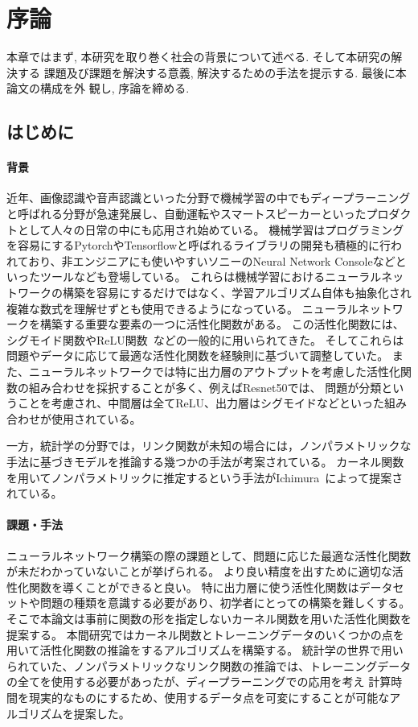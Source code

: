\chapter{序論}
\label{introduction}

本章ではまず, 本研究を取り巻く社会の背景について述べる. そして本研究の解決する
課題及び課題を解決する意義, 解決するための手法を提示する. 最後に本論文の構成を外
観し, 序論を締める.

\section{はじめに}
\label{introduction:background}

\subsubsection{背景}


近年、画像認識や音声認識といった分野で機械学習の中でもディープラーニングと呼ばれる分野が急速発展し、自動運転やスマートスピーカーといったプロダクトとして人々の日常の中にも応用され始めている。
機械学習はプログラミングを容易にするPytorchやTensorflowと呼ばれるライブラリの開発も積極的に行われており、非エンジニアにも使いやすいソニーのNeural Network Consoleなどといったツールなども登場している。
これらは機械学習におけるニューラルネットワークの構築を容易にするだけではなく、学習アルゴリズム自体も抽象化され複雑な数式を理解せずとも使用できるようになっている。
ニューラルネットワークを構築する重要な要素の一つに活性化関数がある。
この活性化関数には、シグモイド関数やReLU関数~\cite{ReLU}などの一般的に用いられてきた。
そしてこれらは問題やデータに応じて最適な活性化関数を経験則に基づいて調整していた。
また、ニューラルネットワークでは特に出力層のアウトプットを考慮した活性化関数の組み合わせを採択することが多く、例えばResnet50では、
問題が分類ということを考慮され、中間層は全てReLU、出力層はシグモイドなどといった組み合わせが使用されている。

一方，統計学の分野では，リンク関数が未知の場合には，ノンパラメトリックな手法に基づきモデルを推論する幾つかの手法が考案されている。
カーネル関数を用いてノンパラメトリックに推定するという手法がIchimura~\cite{ichimura}によって提案されている。

\subsubsection{課題・手法}

ニューラルネットワーク構築の際の課題として、問題に応じた最適な活性化関数が未だわかっていないことが挙げられる。
より良い精度を出すために適切な活性化関数を導くことができると良い。
特に出力層に使う活性化関数はデータセットや問題の種類を意識する必要があり、初学者にとっての構築を難しくする。
そこで本論文は事前に関数の形を指定しないカーネル関数を用いた活性化関数を提案する。
本間研究ではカーネル関数とトレーニングデータのいくつかの点を用いて活性化関数の推論をするアルゴリズムを構築する。
統計学の世界で用いられていた、ノンパラメトリックなリンク関数の推論では、トレーニングデータの全てを使用する必要があったが、ディープラーニングでの応用を考え
計算時間を現実的なものにするため、使用するデータ点を可変にすることが可能なアルゴリズムを提案した。

